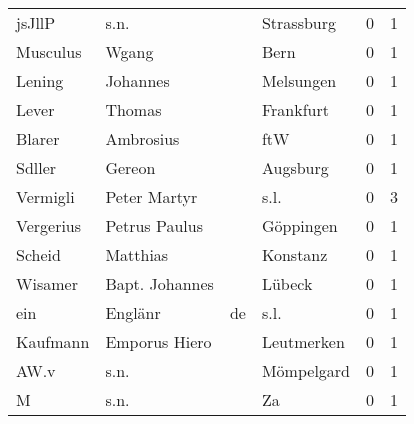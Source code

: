 \begin{tabular}{llllrr}
                   jsJllP &                               s.n. &             &                                  Strassburg &          0 &         1 \\
                 Musculus &                              Wgang &             &                                        Bern &          0 &         1 \\
                   Lening &                           Johannes &             &                                   Melsungen &          0 &         1 \\
                    Lever &                             Thomas &             &                                   Frankfurt &          0 &         1 \\
                   Blarer &                          Ambrosius &             &                                         ftW &          0 &         1 \\
                   Sdller &                             Gereon &             &                                    Augsburg &          0 &         1 \\
                 Vermigli &                       Peter Martyr &             &                                        s.l. &          0 &         3 \\
                Vergerius &                      Petrus Paulus &             &                                   Göppingen &          0 &         1 \\
                   Scheid &                           Matthias &             &                                    Konstanz &          0 &         1 \\
                  Wisamer &                     Bapt. Johannes &             &                                      Lübeck &          0 &         1 \\
                      ein &                            Englänr &          de &                                        s.l. &          0 &         1 \\
                 Kaufmann &                      Emporus Hiero &             &                                  Leutmerken &          0 &         1 \\
                     AW.v &                               s.n. &             &                                  Mömpelgard &          0 &         1 \\
                        M &                               s.n. &             &                                          Za &          0 &         1 \\

\end{tabular}
